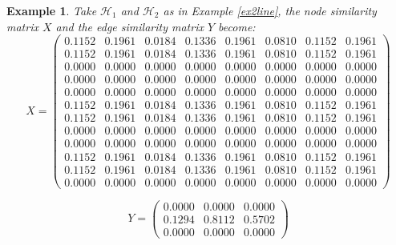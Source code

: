 \documentclass[a4paper,11pt]{report}
\newtheorem{example}[theorem]{Example}
\newcommand{\hgrafeen}{\mathcal{H}}
\begin{document}
\begin{example}
  Take $\hgrafeen_1$ and $\hgrafeen_2$ as in Example \ref{ex2line}, the node 
  similarity matrix $X$ and the edge similarity matrix $Y$ become:
  $$X=\begin{pmatrix}
    0.1152&0.1961&0.0184&0.1336&0.1961&0.0810&0.1152&0.1961\\
0.1152&0.1961&0.0184&0.1336&0.1961&0.0810&0.1152&0.1961\\
0.0000&0.0000&0.0000&0.0000&0.0000&0.0000&0.0000&0.0000\\
0.0000&0.0000&0.0000&0.0000&0.0000&0.0000&0.0000&0.0000\\
0.0000&0.0000&0.0000&0.0000&0.0000&0.0000&0.0000&0.0000\\
0.1152&0.1961&0.0184&0.1336&0.1961&0.0810&0.1152&0.1961\\
0.1152&0.1961&0.0184&0.1336&0.1961&0.0810&0.1152&0.1961\\
0.0000&0.0000&0.0000&0.0000&0.0000&0.0000&0.0000&0.0000\\
0.0000&0.0000&0.0000&0.0000&0.0000&0.0000&0.0000&0.0000\\
0.1152&0.1961&0.0184&0.1336&0.1961&0.0810&0.1152&0.1961\\
0.1152&0.1961&0.0184&0.1336&0.1961&0.0810&0.1152&0.1961\\
0.0000&0.0000&0.0000&0.0000&0.0000&0.0000&0.0000&0.0000
  \end{pmatrix}$$
  
    $$Y=\begin{pmatrix}
    0.0000&0.0000&0.0000\\
0.1294&0.8112&0.5702\\
0.0000&0.0000&0.0000
  \end{pmatrix}$$
  

\end{example}
\end{document}
